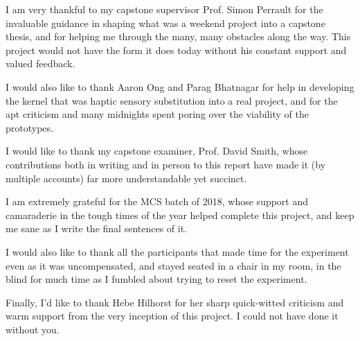 \documentclass[
hidelinks,
12pt, %
oneside, %
english, %
doublespacing, %
headsepline, %
]{MastersDoctoralThesis} %
\begin{document}
\begin{acknowledgements}
\addchaptertocentry{\acknowledgementname} %

I am very thankful to my capstone supervisor Prof. Simon Perrault for the invaluable guidance in shaping what was a weekend project into a capstone thesis, and for helping me through the many, many obstacles along the way. This project would not have the form it does today without his constant support and valued feedback.

I would also like to thank Aaron Ong and Parag Bhatnagar for help in developing the kernel that was haptic sensory substitution into a real project, and for the apt criticism and many midnights spent poring over the viability of the prototypes.

I would like to thank my capstone examiner, Prof. David Smith, whose contributions both in writing and in person to this report have made it (by multiple accounts) far more understandable yet succinct.

I am extremely grateful for the MCS batch of 2018, whose support and camaraderie in the tough times of the year helped complete this project, and keep me sane as I write the final sentences of it.

I would also like to thank all the participants that made time for the experiment even as it was uncompensated, and stayed seated in a chair in my room, in the blind for much time as I fumbled about trying to reset the experiment.

Finally, I'd like to thank Hebe Hilhorst for her sharp quick-witted criticism and warm support from the very inception of this project. I could not have done it without you.

\end{acknowledgements}


\tableofcontents %

\listoffigures %

\listoftables %

\end{document}
